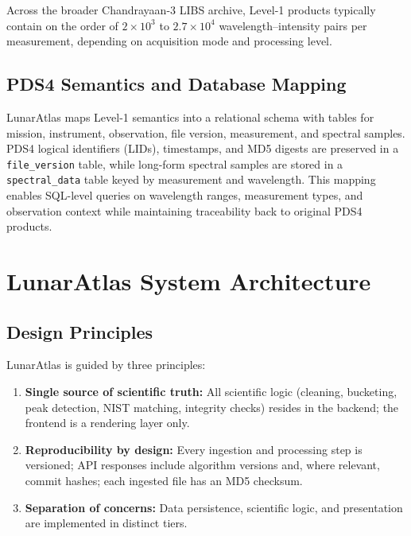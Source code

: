 \documentclass[12pt,a4paper]{article}
\begin{document}
Across the broader Chandrayaan-3 LIBS archive, Level-1 products typically contain on the order of \(2\times 10^3\) to \(2.7\times 10^4\) wavelength–intensity pairs per measurement, depending on acquisition mode and processing level.

\subsection{PDS4 Semantics and Database Mapping}

LunarAtlas maps Level-1 semantics into a relational schema with tables for mission, instrument, observation, file version, measurement, and spectral samples. PDS4 logical identifiers (LIDs), timestamps, and MD5 digests are preserved in a \texttt{file\_version} table, while long-form spectral samples are stored in a \texttt{spectral\_data} table keyed by measurement and wavelength. This mapping enables SQL-level queries on wavelength ranges, measurement types, and observation context while maintaining traceability back to original PDS4 products.

\section{LunarAtlas System Architecture}
\label{sec:architecture}

\subsection{Design Principles}

LunarAtlas is guided by three principles:

\begin{enumerate}[nosep]
  \item \textbf{Single source of scientific truth:} All scientific logic (cleaning, bucketing, peak detection, NIST matching, integrity checks) resides in the backend; the frontend is a rendering layer only.
  \item \textbf{Reproducibility by design:} Every ingestion and processing step is versioned; API responses include algorithm versions and, where relevant, commit hashes; each ingested file has an MD5 checksum.
  \item \textbf{Separation of concerns:} Data persistence, scientific logic, and presentation are implemented in distinct tiers.
\end{enumerate}
\end{document}
